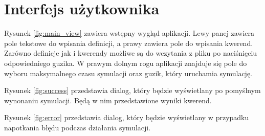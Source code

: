 \documentclass{article}
\begin{document}

\section{Interfejs użytkownika}

Rysunek \ref{fig:main_view} zawiera wstępny wygląd aplikacji. Lewy panej zawiera pole tekstowe do wpisania definicji, a prawy zawiera pole do wpisania kwerend. Zarówno definicje jak i kwerendy możliwe są do wczytania z pliku po naciśnięciu odpowiedniego guzika. W prawym dolnym rogu aplikacji znajduje się pole do wyboru maksymalnego czasu symulacji oraz guzik, który uruchamia symulację.

Rysunek \ref{fig:success} przedstawia dialog, który będzie wyświetlany po pomyślnym wynonaniu symulacji. Będą w nim przedstawione wyniki kwerend.

Rysunek \ref{fig:error} przedstawia dialog, który będzie wyświetlany w przypadku napotkania błędu podczas działania symulacji.
\end{document}
